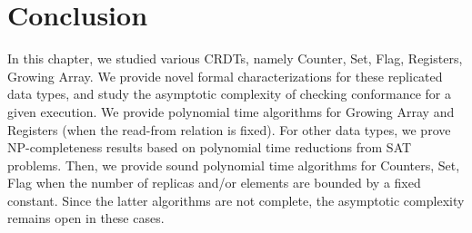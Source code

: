 \section{Conclusion}
\label{sec:crdt:conclusion}

In this chapter, we studied various CRDTs, namely Counter, Set, Flag, Registers, Growing Array. We provide novel formal characterizations for these replicated data types, and study the asymptotic complexity of checking conformance for a given execution. We provide polynomial time algorithms for Growing Array and Registers (when the read-from relation is fixed). For other data types, we prove NP-completeness results based on polynomial time reductions from SAT problems. Then, we provide sound polynomial time algorithms for Counters, Set, Flag when the number of replicas and/or elements are bounded by a fixed constant. Since the latter algorithms are not complete, the asymptotic complexity remains open in these cases.